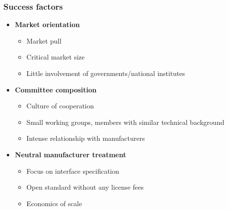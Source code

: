 \begin{frame}
  \frametitle{Success factors}
  
  \begin{itemize}
    \item \textbf{Market orientation}
      \begin{itemize}
       \item Market pull
       \item Critical market size
       \item Little involvement of governments/national institutes
      \end{itemize}
  \end{itemize}

  \begin{itemize}
    \item \textbf{Committee composition}
      \begin{itemize}
	\item Culture of cooperation
	\item Small working groups, members with similar technical background
	\item Intense relationship with manufacturers
      \end{itemize}
  \end{itemize}

  \begin{itemize}
    \item \textbf{Neutral manufacturer treatment}
      \begin{itemize}
       \item Focus on interface specification
       \item Open standard without any license fees
       \item Economics of scale       
      \end{itemize}
  \end{itemize}
\end{frame}
